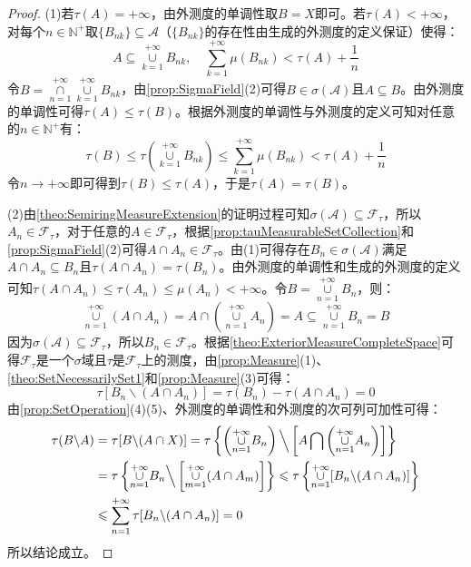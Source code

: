 \begin{proof}
	(1)若$\tau(A)=+\infty$，由外测度的单调性取$B=X$即可。若$\tau(A)<+\infty$，对每个$n\in\mathbb{N}^+$取$\{B_{nk}\}\subseteq\mathscr{A}$（$\{B_{nk}\}$的存在性由生成的外测度的定义保证）使得：
	\begin{equation*}
		A\subseteq\underset{k=1}{\overset{+\infty}{\cup}}B_{nk},\quad\sum_{k=1}^{+\infty}\mu(B_{nk})<\tau(A)+\frac{1}{n}
	\end{equation*}
	令$B=\underset{n=1}{\overset{+\infty}{\cap}}\underset{k=1}{\overset{+\infty}{\cup}}B_{nk}$，由\cref{prop:SigmaField}(2)可得$B\in\sigma(\mathscr{A})$且$A\subseteq B$。由外测度的单调性可得$\tau(A)\leqslant\tau(B)$。根据外测度的单调性与外测度的定义可知对任意的$n\in\mathbb{N}^+$有：
	\begin{equation*}
		\tau(B)\leqslant\tau\left(\underset{k=1}{\overset{+\infty}{\cup}}B_{nk}\right)\leqslant\sum_{k=1}^{+\infty}\mu(B_{nk})<\tau(A)+\frac{1}{n}
	\end{equation*}
	令$n\to+\infty$即可得到$\tau(B)\leqslant\tau(A)$，于是$\tau(A)=\tau(B)$。\par
	(2)由\cref{theo:SemiringMeasureExtension}的证明过程可知$\sigma(\mathscr{A})\subseteq\mathscr{F}_\tau$，所以$A_n\in\mathscr{F}_\tau$，对于任意的$A\in\mathscr{F}_\tau$，根据\cref{prop:tauMeasurableSetCollection}和\cref{prop:SigmaField}(2)可得$A\cap A_n\in\mathscr{F}_\tau$。由(1)可得存在$B_n\in\sigma(\mathscr{A})$满足$A\cap A_n\subseteq B_n$且$\tau(A\cap A_n)=\tau(B_n)$。由外测度的单调性和生成的外测度的定义可知$\tau(A\cap A_n)\leqslant\tau(A_n)\leqslant\mu(A_n)<+\infty$。令$B=\underset{n=1}{\overset{+\infty}{\cup}}B_n$，则：
	\begin{equation*}
		\underset{n=1}{\overset{+\infty}{\cup}}(A\cap A_n)=A\cap\left(\underset{n=1}{\overset{+\infty}{\cup}}A_n\right)=A\subseteq\underset{n=1}{\overset{+\infty}{\cup}}B_n=B
	\end{equation*}
	因为$\sigma(\mathscr{A})\subseteq\mathscr{F}_\tau$，所以$B_n\in\mathscr{F}_\tau$。根据\cref{theo:ExteriorMeasureCompleteSpace}可得$\mathscr{F}_\tau$是一个$\sigma$域且$\tau$是$\mathscr{F}_\tau$上的测度，由\cref{prop:Measure}(1)、\cref{theo:SetNecessarilySet1}和\cref{prop:Measure}(3)可得：
	\begin{equation*}
		\tau[B_n\backslash (A\cap A_n)]=\tau(B_n)-\tau(A\cap A_n)=0
	\end{equation*}
	由\cref{prop:SetOperation}(4)(5)、外测度的单调性和外测度的次可列可加性可得：
	\begin{align*}
		\tau(B\backslash A)&=\tau[B\backslash(A\cap X)]=\tau\left\{\left(\underset{n=1}{\overset{+\infty}{\cup}}B_n\right)\Big\backslash\left[A\bigcap\left(\underset{n=1}{\overset{+\infty}{\cup}}A_n\right)\right]\right\} \\
		&=\tau\left\{\underset{n=1}{\overset{+\infty}{\cup}}B_n\Big\backslash\left[\underset{m=1}{\overset{+\infty}{\cup}}(A\cap A_m)\right]\right\}\leqslant\tau\left\{\underset{n=1}{\overset{+\infty}{\cup}}[B_n\backslash(A\cap A_n)]\right\} \\
		&\leqslant\sum_{n=1}^{+\infty}\tau[B_n\backslash(A\cap A_n)]=0
	\end{align*}
	所以结论成立。
\end{proof}

